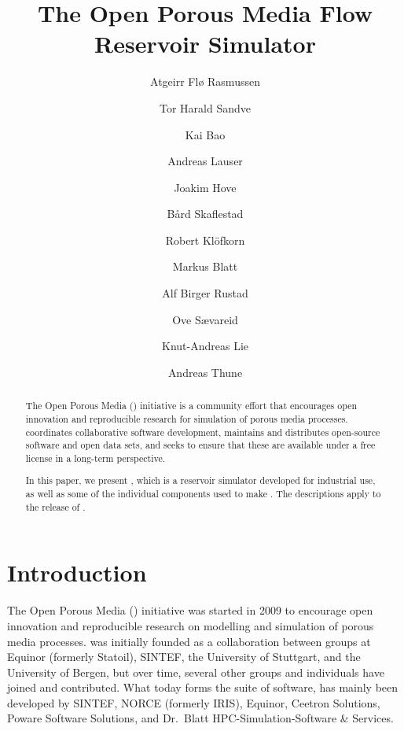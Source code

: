 
\begin{frontmatter}

\title{The Open Porous Media Flow Reservoir Simulator}

\author[1]{Atgeirr Fl{\o} Rasmussen}
\author[2]{Tor Harald Sandve}
\author[1]{Kai Bao}
\author[3]{Andreas Lauser}
\author[4]{Joakim Hove}
\author[1]{B{\aa}rd Skaflestad}
\author[2]{Robert Kl\"ofkorn}
\author[4]{Markus Blatt}
\author[5]{Alf Birger Rustad}
\author[2]{Ove S{\ae}vareid}
\author[1]{Knut-Andreas Lie}
\author[6]{Andreas Thune}
\address[1]{SINTEF Digital}
\address[2]{NORCE Norwegian Research Centre AS}
\address[3]{Poware Software Solutions}
\address[4]{OPM-OP AS}
\address[5]{Equinor ASA}
\address[6]{Simula Research Laboratory}


\begin{abstract}
  The Open Porous Media (\opm) initiative is a community effort
  that encourages open innovation and reproducible research for
  simulation of porous media processes. \opm coordinates
  collaborative software development, maintains and distributes
  open-source software and open data sets, and seeks to ensure that
  these are available under a free license in a long-term perspective.

  In this paper, we present \opmflow, which is a reservoir simulator
  developed for industrial use, as well as some of the individual
  components used to make \opmflow. The descriptions apply to the \opmversion 
  release of \opm.
\end{abstract}

\end{frontmatter}

\enablelinenumbers


\section{Introduction}


The Open Porous Media (\opm) initiative was started in 2009 to
encourage open innovation and reproducible research on modelling and
simulation of porous media processes. \opm was initially founded as a
collaboration between groups at Equinor (formerly Statoil), SINTEF, the University of
Stuttgart, and the University of Bergen, but over time, several other groups
and individuals have joined and contributed. What today forms the \opm suite of
software, has mainly been developed by SINTEF, NORCE (formerly IRIS),
Equinor, Ceetron Solutions,
Poware Software Solutions, and Dr.~Blatt HPC-Simulation-Software \& Services.

